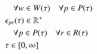 \begin{alignat}{2}
	& \quad \forall w \in W(\tau) \quad \forall p \in P(\tau)     \label{eqn:x_integrality_constraint}                                                                                                                                                                 \\ 
	& \epsilon_{pr}(\tau) \in \mathbb{R}^{+} \notag                                                                                                                                                                                                                                                            \\ 
	& \quad \forall p \in P(\tau) \quad \forall r \in R(\tau)                           \label{eqn:p_non_negativity_constraint}                                                                                                                                            \\ 
	& \tau \in  [0, \infty] 
\end{alignat}

